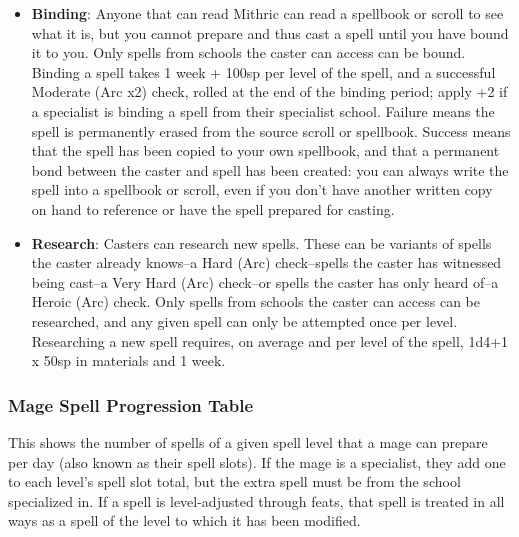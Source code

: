 \documentclass{article}
\begin{document}
\begin{multicols}{2}
\begin{itemize}
\tightlist
\item
  \textbf{Binding}: Anyone that can read Mithric can read a spellbook or
  scroll to see what it is, but you cannot prepare and thus cast a spell
  until you have bound it to you. Only spells from schools the caster
  can access can be bound. Binding a spell takes 1 week + 100sp per
  level of the spell, and a successful Moderate (Arc x2) check, rolled
  at the end of the binding period; apply +2 if a specialist is binding
  a spell from their specialist school. Failure means the spell is
  permanently erased from the source scroll or spellbook. Success means
  that the spell has been copied to your own spellbook, and that a
  permanent bond between the caster and spell has been created: you can
  always write the spell into a spellbook or scroll, even if you don't
  have another written copy on hand to reference or have the spell
  prepared for casting.
\item
  \textbf{Research}: Casters can research new spells. These can be
  variants of spells the caster already knows--a Hard (Arc)
  check--spells the caster has witnessed being cast--a Very Hard (Arc)
  check--or spells the caster has only heard of--a Heroic (Arc) check.
  Only spells from schools the caster can access can be researched, and
  any given spell can only be attempted once per level. Researching a
  new spell requires, on average and per level of the spell, 1d4+1 x
  50sp in materials and 1 week.
\end{itemize}

\subsubsection{Mage Spell Progression
Table}\label{mage-spell-progression-table}

This shows the number of spells of a given spell level that a mage can
prepare per day (also known as their spell slots). If the mage is a
specialist, they add one to each level's spell slot total, but the extra
spell must be from the school specialized in. If a spell is
level-adjusted through feats, that spell is treated in all ways as a
spell of the level to which it has been modified.


\end{multicols}
\end{document}
